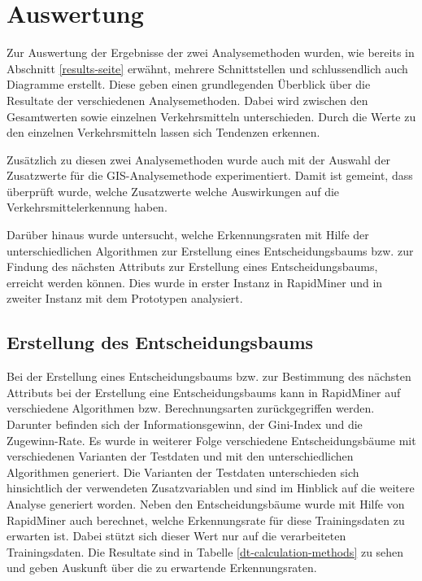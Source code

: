 \chapter{Auswertung}
\label{auswertung}

Zur Auswertung der Ergebnisse der zwei Analysemethoden wurden, wie bereits in Abschnitt \ref{results-seite}   erwähnt, mehrere Schnittstellen und schlussendlich auch Diagramme erstellt. Diese geben einen grundlegenden Überblick über die Resultate der verschiedenen Analysemethoden. Dabei wird zwischen den Gesamtwerten sowie einzelnen Verkehrsmitteln unterschieden. Durch die Werte zu den einzelnen Verkehrsmitteln lassen sich Tendenzen erkennen. 
 
Zusätzlich zu diesen zwei Analysemethoden wurde auch mit der Auswahl der Zusatzwerte für die GIS-Analysemethode experimentiert. Damit ist gemeint, dass überprüft wurde, welche Zusatzwerte welche Auswirkungen auf die Verkehrsmittelerkennung haben. 

Darüber hinaus wurde untersucht, welche Erkennungsraten mit Hilfe der unterschiedlichen Algorithmen zur Erstellung eines Entscheidungsbaums bzw. zur Findung des nächsten Attributs zur Erstellung eines Entscheidungsbaums, erreicht werden können. Dies wurde in erster Instanz in RapidMiner und in zweiter Instanz mit dem Prototypen analysiert.
\clearpage

\section{Erstellung des Entscheidungsbaums}
\label{rapidMinerResultat}
Bei der Erstellung eines Entscheidungsbaums bzw. zur Bestimmung des nächsten Attributs bei der Erstellung eine Entscheidungsbaums kann in RapidMiner auf verschiedene Algorithmen bzw. Berechnungsarten zurückgegriffen werden. Darunter befinden sich der Informationsgewinn, der Gini-Index und die Zugewinn-Rate. Es wurde in weiterer Folge verschiedene Entscheidungsbäume mit verschiedenen Varianten der Testdaten und mit den unterschiedlichen Algorithmen generiert. Die Varianten der Testdaten unterschieden sich hinsichtlich der verwendeten Zusatzvariablen und sind im Hinblick auf die weitere Analyse generiert worden. Neben den Entscheidungsbäume wurde mit Hilfe von RapidMiner auch berechnet, welche Erkennungsrate für diese Trainingsdaten zu erwarten ist. Dabei stützt sich dieser Wert nur auf die verarbeiteten Trainingsdaten. Die Resultate sind in Tabelle \ref{dt-calculation-methods} zu sehen und geben Auskunft über die zu erwartende Erkennungsraten. 


